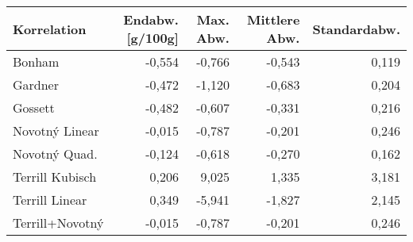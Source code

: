 \begin{tabular}{lrrrr}
\toprule
    Korrelation &  Endabw. [g/100g] &  Max. Abw. &  Mittlere Abw. &  Standardabw. \\
\midrule
         Bonham &            -0,554 &     -0,766 &         -0,543 &         0,119 \\
        Gardner &            -0,472 &     -1,120 &         -0,683 &         0,204 \\
        Gossett &            -0,482 &     -0,607 &         -0,331 &         0,216 \\
 Novotný Linear &            -0,015 &     -0,787 &         -0,201 &         0,246 \\
  Novotný Quad. &            -0,124 &     -0,618 &         -0,270 &         0,162 \\
Terrill Kubisch &             0,206 &      9,025 &          1,335 &         3,181 \\
 Terrill Linear &             0,349 &     -5,941 &         -1,827 &         2,145 \\
Terrill+Novotný &            -0,015 &     -0,787 &         -0,201 &         0,246 \\
\bottomrule
\end{tabular}
